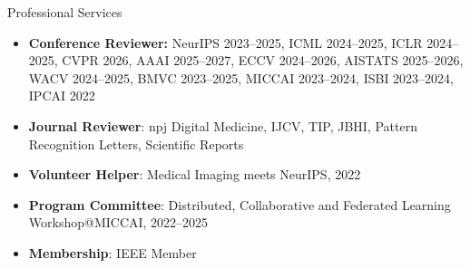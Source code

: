 \documentclass[a4paper]{resume} %
\begin{document}
\begin{rSection}{Professional Services}

\begin{itemize}

\item {\bf Conference Reviewer:} NeurIPS 2023--2025, ICML 2024--2025, ICLR 2024--2025,  CVPR 2026,  AAAI 2025--2027, ECCV 2024--2026, AISTATS 2025--2026, WACV 2024--2025, BMVC 2023--2025, MICCAI 2023--2024, ISBI 2023--2024, IPCAI 2022
\item {\bf Journal Reviewer}: npj Digital Medicine, IJCV, TIP, JBHI, Pattern Recognition Letters, Scientific Reports
\item {\bf Volunteer Helper}: Medical Imaging meets NeurIPS, 2022
\item {\bf Program Committee}: Distributed, Collaborative and Federated Learning Workshop@MICCAI, 2022--2025
\item {\bf Membership}: IEEE Member

\end{itemize}



\end{rSection}
\end{document}
